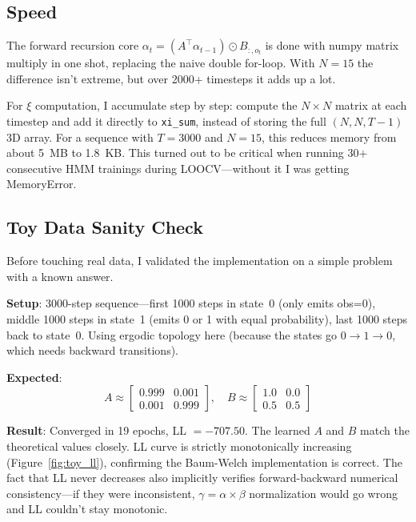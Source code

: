 \documentclass[11pt]{article}
\begin{document}
\subsection{Speed}

The forward recursion core $\alpha_{t} = (A^\top \alpha_{t-1}) \odot B_{:,o_t}$ is done with numpy matrix multiply in one shot, replacing the naive double for-loop. With $N=15$ the difference isn't extreme, but over 2000+ timesteps it adds up a lot.

For $\xi$ computation, I accumulate step by step: compute the $N \times N$ matrix at each timestep and add it directly to \texttt{xi\_sum}, instead of storing the full $(N, N, T-1)$ 3D array. For a sequence with $T=3000$ and $N=15$, this reduces memory from about 5~MB to 1.8~KB. This turned out to be critical when running 30+ consecutive HMM trainings during LOOCV---without it I was getting MemoryError.

\subsection{Toy Data Sanity Check}

Before touching real data, I validated the implementation on a simple problem with a known answer.

\textbf{Setup}: 3000-step sequence---first 1000 steps in state~0 (only emits obs=0), middle 1000 steps in state~1 (emits 0 or 1 with equal probability), last 1000 steps back to state~0. Using ergodic topology here (because the states go $0 \to 1 \to 0$, which needs backward transitions).

\textbf{Expected}:
\[
A \approx \begin{bmatrix} 0.999 & 0.001 \\ 0.001 & 0.999 \end{bmatrix}, \quad
B \approx \begin{bmatrix} 1.0 & 0.0 \\ 0.5 & 0.5 \end{bmatrix}
\]

\textbf{Result}: Converged in 19 epochs, LL $= -707.50$. The learned $A$ and $B$ match the theoretical values closely. LL curve is strictly monotonically increasing (Figure~\ref{fig:toy_ll}), confirming the Baum-Welch implementation is correct. The fact that LL never decreases also implicitly verifies forward-backward numerical consistency---if they were inconsistent, $\gamma = \alpha \times \beta$ normalization would go wrong and LL couldn't stay monotonic.
\end{document}
